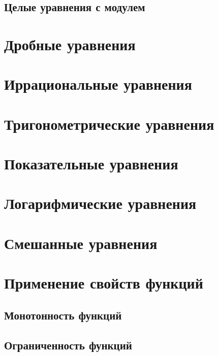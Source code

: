 \documentclass[10pt, a4paper]{article}
\begin{document}
	\subsection{Целые уравнения с модулем}
\section{Дробные уравнения}
\section{Иррациональные уравнения}
\section{Тригонометрические уравнения}
\section{Показательные уравнения}
\section{Логарифмические уравнения}
\section{Смешанные уравнения}
\section{Применение свойств функций}
	\subsection{Монотонность функций}
	\subsection{Ограниченность функций}
\end{document}
